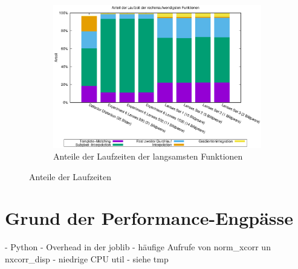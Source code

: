 \begin{center}
\begin{figure}[htbp]
		\begin{subfigure}[b]{0.7\textwidth}
			\centering
			\includegraphics[width=\textwidth]{pdf/slow}
			\caption{Anteile der Laufzeiten der langsamsten Funktionen}
			\label{fig:perc_slow}
		\end{subfigure}
		\caption{Anteile der Laufzeiten}
	\end{figure}
\end{center}

\section{Grund der Performance-Engpässe}

\begin{correctmore}
	- Python
	- Overhead in der joblib
	- häufige Aufrufe von norm\_xcorr un nxcorr\_disp
	- niedrige CPU util
	- siehe tmp
\end{correctmore}